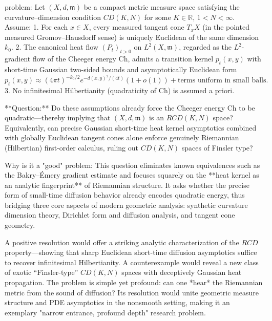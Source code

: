 problem:  
Let \((X,d,\mathfrak{m})\) be a compact metric measure space satisfying the curvature–dimension condition \(CD(K,N)\) for some \(K\in\mathbb{R}\), \(1<N<\infty\).  
Assume:  
1. For each \(x\in X\), every measured tangent cone \(T_xX\) (in the pointed measured Gromov–Hausdorff sense) is uniquely Euclidean of the same dimension \(k_0\).  
2. The canonical heat flow \((P_t)_{t>0}\) on \(L^2(X,\mathfrak{m})\), regarded as the \(L^2\)-gradient flow of the Cheeger energy \(\mathrm{Ch}\), admits a transition kernel \(p_t(x,y)\) with short-time Gaussian two-sided bounds and asymptotically Euclidean form  
   \[
   p_t(x,y)\approx (4\pi t)^{-k_0/2}e^{-d(x,y)^2/(4t)}(1+o(1))+ \text{terms uniform in small balls.}
   \]
3. No infinitesimal Hilbertianity (quadraticity of \(\mathrm{Ch}\)) is assumed a priori.  

**Question:**  
Do these assumptions already force the Cheeger energy \(\mathrm{Ch}\) to be quadratic—thereby implying that \((X,d,\mathfrak{m})\) is an \(RCD(K,N)\) space?  
Equivalently, can precise Gaussian short-time heat kernel asymptotics combined with globally Euclidean tangent cones alone enforce genuinely Riemannian (Hilbertian) first-order calculus, ruling out \(CD(K,N)\) spaces of Finsler type?  

Why is it a "good" problem:  
This question eliminates known equivalences such as the Bakry–Émery gradient estimate and focuses squarely on the **heat kernel as an analytic fingerprint** of Riemannian structure. It asks whether the precise form of small-time diffusion behavior already encodes quadratic energy, thus bridging three core aspects of modern geometric analysis: synthetic curvature dimension theory, Dirichlet form and diffusion analysis, and tangent cone geometry.  

A positive resolution would offer a striking analytic characterization of the \(RCD\) property—showing that sharp Euclidean short-time diffusion asymptotics suffice to recover infinitesimal Hilbertianity. A counterexample would reveal a new class of exotic “Finsler-type” \(CD(K,N)\) spaces with deceptively Gaussian heat propagation. The problem is simple yet profound: can one *hear* the Riemannian metric from the sound of diffusion? Its resolution would unite geometric measure structure and PDE asymptotics in the nonsmooth setting, making it an exemplary "narrow entrance, profound depth" research problem.